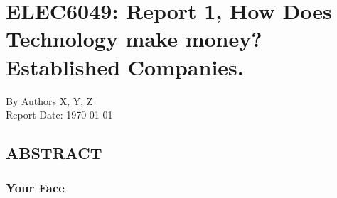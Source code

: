 \documentclass[11pt,a4paper]{article}
\newcommand{\authornames}{Authors X, Y, Z}
\newcommand{\reportname}{ELEC6049: Report 1, How Does Technology make money? Established Companies.}
\begin{document}
\section{\reportname}
\large{By \authornames}
\\
Report Date: \today
\subsection{ABSTRACT}

\subsubsection{Your Face}
\end{document}
